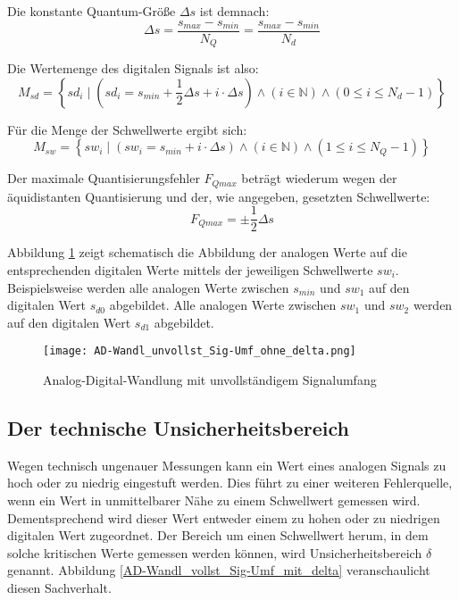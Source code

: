 Die konstante Quantum-Größe $\Delta s$ ist demnach:
\[ 
	\Delta s = \frac { s_{max} - s_{min} } { N_Q } 
	         = \frac { s_{max} - s_{min} } { N_d }
\]

Die Wertemenge des digitalen Signals ist also:
\[ 
	M_{sd} =  \left\{ sd_i \mid 
	                           \left(sd_i = s_{min} 
	                           + \frac{1}{2} \Delta s + i \cdot \Delta s\right)
                               \wedge (i \in \mathbb{N})
	                           \wedge (0 \le i \le N_d - 1)  \right\}
\]

Für die Menge der Schwellwerte ergibt sich:
\[ 
	M_{sw} =  \left\{ sw_i \mid 
	                           \left(sw_i = s_{min} + i \cdot \Delta s\right)
                               \wedge (i \in \mathbb{N})
	                           \wedge (1 \le i \le N_Q - 1)  \right\}
\]

Der maximale Quantisierungsfehler $F_{Qmax}$ beträgt wiederum wegen der äquidistanten Quantisierung und der, wie angegeben, gesetzten Schwellwerte:
\[ 
	F_{Qmax} = \pm \frac{1}{2} \Delta s
\]

Abbildung \ref{AD-Wandl_unvollst_Sig-Umf_ohne_delta} zeigt schematisch die Abbildung der analogen Werte auf die entsprechenden digitalen Werte mittels der jeweiligen Schwellwerte $sw_i$. Beispielsweise werden alle analogen Werte zwischen $s_{min}$ und $sw_1$ auf den digitalen Wert $s_{d0}$ abgebildet. Alle analogen Werte zwischen $sw_1$ und $sw_2$ werden auf den digitalen Wert $s_{d1}$ abgebildet.

\begin{figure}[htbp] %
	\centering
	\texttt{[image: AD-Wandl\_unvollst\_Sig-Umf\_ohne\_delta.png]}
	\caption{Analog-Digital-Wandlung mit unvollständigem Signalumfang}
	\label{AD-Wandl_unvollst_Sig-Umf_ohne_delta}
\end{figure}

\subsection{Der technische Unsicherheitsbereich}
Wegen technisch ungenauer Messungen kann ein Wert eines analogen Signals zu hoch oder zu niedrig eingestuft werden. Dies führt zu einer weiteren Fehlerquelle, wenn ein Wert in unmittelbarer Nähe zu einem Schwellwert gemessen wird. Dementsprechend wird dieser Wert entweder einem zu hohen oder zu niedrigen digitalen Wert zugeordnet. Der Bereich um einen Schwellwert herum, in dem solche kritischen Werte gemessen werden können, wird Unsicherheitsbereich $\delta$ genannt. Abbildung \ref{AD-Wandl_vollst_Sig-Umf_mit_delta} veranschaulicht diesen Sachverhalt.

